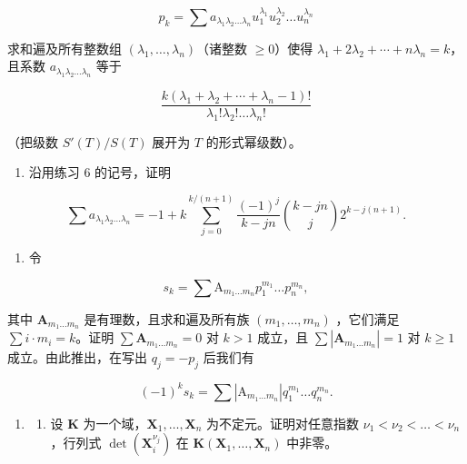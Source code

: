 \[
p _ {k} = \sum a _ {\lambda_ {1} \lambda_ {2} \dots \lambda_ {n}} u _ {1} ^ {\lambda_ {1}} u _ {2} ^ {\lambda_ {2}} \dots u _ {n} ^ {\lambda_ {n}}
\]

求和遍及所有整数组 \((\lambda_{1},\ldots,\lambda_{n})\)（诸整数 \(\geqslant0\)）使得 \(\lambda_{1}+2\lambda_{2}+\cdots+n\lambda_{n}=k\)，且系数 \(a_{\lambda_{1}\lambda_{2}\ldots\lambda_{n}}\) 等于

\[
\frac {k \left(\lambda_ {1} + \lambda_ {2} + \cdots + \lambda_ {n} - 1\right) !}{\lambda_ {1} ! \lambda_ {2} ! \dots \lambda_ {n} !}
\]

（把级数 \(S'(T) / S(T)\) 展开为 \(T\) 的形式幂级数）。

\begin{enumerate}
\def\labelenumi{\arabic{enumi})}
\setcounter{enumi}{6}
\tightlist
\item
  沿用练习 6 的记号，证明
\end{enumerate}

\[
\sum a _ {\lambda_ {1} \lambda_ {2} \dots \lambda_ {n}} = - 1 + k \sum_ {j = 0} ^ {k / (n + 1)} \frac {(- 1) ^ {j}}{k - j n} \binom {k - j n} {j} 2 ^ {k - j (n + 1)}.
\]

\begin{enumerate}
\def\labelenumi{\arabic{enumi})}
\setcounter{enumi}{7}
\tightlist
\item
  令
\end{enumerate}

\[
s _ {k} = \sum \mathrm{A} _ {m _ {1} \dots m _ {n}} p _ {1} ^ {m _ {1}} \dots p _ {n} ^ {m _ {n}},
\]

其中 \(\mathbf{A}_{m_1\dots m_n}\) 是有理数，且求和遍及所有族 \((m_1,\dots,m_n)\) ，它们满足 \(\sum i\cdot m_i = k\)。证明 \(\sum \mathbf{A}_{m_1\dots m_n} = 0\) 对 \(k > 1\) 成立，且 \(\sum |\mathbf{A}_{m_1\dots m_n}| = 1\) 对 \(k\geqslant 1\) 成立。由此推出，在写出 \(q_{j} = -p_{j}\) 后我们有

\[
(- 1) ^ {k} s _ {k} = \sum \left| \mathrm{A} _ {m _ {1} \dots m _ {n}} \right| q _ {1} ^ {m _ {1}} \dots q _ {n} ^ {m _ {n}}.
\]

\begin{enumerate}
\def\labelenumi{\arabic{enumi})}
\setcounter{enumi}{8}
\tightlist
\item
  \begin{enumerate}
  \def\labelenumii{\alph{enumii})}
  \tightlist
  \item
    设 \(\mathbf{K}\) 为一个域，\(\mathbf{X}_1, \ldots, \mathbf{X}_n\) 为不定元。证明对任意指数 \(\nu_1 < \nu_2 < \ldots < \nu_n\)，行列式 \(\det(\mathbf{X}_i^{\nu_j})\) 在 \(\mathbf{K}(\mathbf{X}_1, \ldots, \mathbf{X}_n)\) 中非零。
  \end{enumerate}
\end{enumerate}

